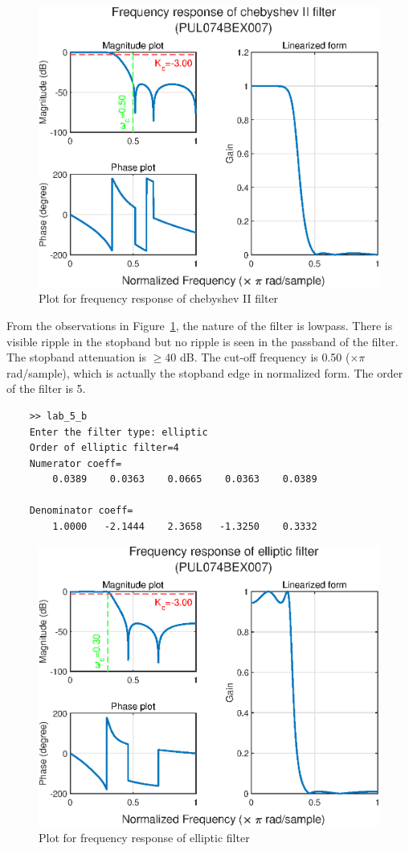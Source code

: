 \documentclass{lab_sheet}
\begin{document}
\begin{figure}[H]
    \centering
    \includegraphics[width=0.8\linewidth]{../Figures/chebyshev II.eps}
    \caption{Plot for frequency response of chebyshev II filter}
    \label{fig:5_2_cheby2}
\end{figure}
From the observations in Figure~\ref{fig:5_2_cheby2}, the nature of the filter is lowpass. There is visible ripple in the stopband but no ripple is seen in the passband of the filter. The stopband attenuation is $\geq40$ dB. The cut-off frequency is 0.50 ($\times \pi$ rad/sample), which is actually the stopband edge in normalized form. The order of the filter is 5. 
\begin{verbatim}
    >> lab_5_b
    Enter the filter type: elliptic
    Order of elliptic filter=4
    Numerator coeff=
        0.0389    0.0363    0.0665    0.0363    0.0389
    
    Denominator coeff=
        1.0000   -2.1444    2.3658   -1.3250    0.3332
\end{verbatim}
\begin{figure}[H]
    \centering
    \includegraphics[width=0.8\linewidth]{../Figures/elliptic.eps}
    \caption{Plot for frequency response of elliptic filter}
    \label{fig:5_2_ellip}
\end{figure}
\end{document}
